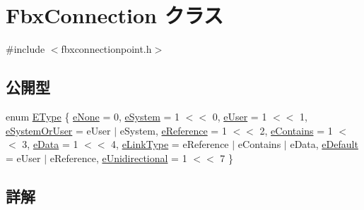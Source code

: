 \hypertarget{class_fbx_connection}{}\section{Fbx\+Connection クラス}
\label{class_fbx_connection}


{\ttfamily \#include $<$fbxconnectionpoint.\+h$>$}

\subsection*{公開型}
\begin{DoxyCompactItemize}
\item 
enum \hyperlink{class_fbx_connection_a3df448a5db356652ab99fd2be2553749}{E\+Type} \{ \newline
\hyperlink{class_fbx_connection_a3df448a5db356652ab99fd2be2553749a47aa04870c3c0769263e3972e67e9ebe}{e\+None} = 0, 
\hyperlink{class_fbx_connection_a3df448a5db356652ab99fd2be2553749a92429761695ae31e7bc3257c79881f71}{e\+System} = 1 $<$$<$ 0, 
\hyperlink{class_fbx_connection_a3df448a5db356652ab99fd2be2553749a49fcc02ebff96f18851b208474307ba8}{e\+User} = 1 $<$$<$ 1, 
\hyperlink{class_fbx_connection_a3df448a5db356652ab99fd2be2553749abf06b5ecc849595c80f9da875da1175b}{e\+System\+Or\+User} = e\+User $\vert$ e\+System, 
\newline
\hyperlink{class_fbx_connection_a3df448a5db356652ab99fd2be2553749a7ec0099e91989fc4bf05e47bd43c4681}{e\+Reference} = 1 $<$$<$ 2, 
\hyperlink{class_fbx_connection_a3df448a5db356652ab99fd2be2553749a4415e3b73e6a0d70bcc92b0082bb6b51}{e\+Contains} = 1 $<$$<$ 3, 
\hyperlink{class_fbx_connection_a3df448a5db356652ab99fd2be2553749a09096c73e898aa5a553c55b4b6afd571}{e\+Data} = 1 $<$$<$ 4, 
\hyperlink{class_fbx_connection_a3df448a5db356652ab99fd2be2553749a2fd0b59d9b15aefe864aa42541dac350}{e\+Link\+Type} = e\+Reference $\vert$ e\+Contains $\vert$ e\+Data, 
\newline
\hyperlink{class_fbx_connection_a3df448a5db356652ab99fd2be2553749a93ca385d7cc25fef28232a2d10b836e3}{e\+Default} = e\+User $\vert$ e\+Reference, 
\hyperlink{class_fbx_connection_a3df448a5db356652ab99fd2be2553749ab0ed7d506ad79f538e46cf3fa111df5a}{e\+Unidirectional} = 1 $<$$<$ 7
 \}
\end{DoxyCompactItemize}


\subsection{詳解}


